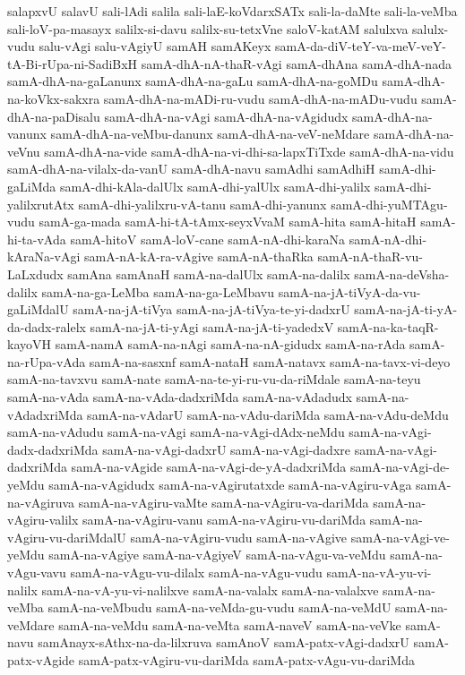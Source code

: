 {salapxvU
salavU
sali-lAdi
salila
sali-laE-koVdarxSATx
sali-la-daMte
sali-la-veMba
sali-loV-pa-masayx
salilx-si-davu
salilx-su-tetxVne
saloV-katAM
salulxva
salulx-vudu
salu-vAgi
salu-vAgiyU
samAH
samAKeyx
samA-da-diV-teY-va-meV-veY-tA-Bi-rUpa-ni-SadiBxH
samA-dhA-nA-thaR-vAgi
samA-dhAna
samA-dhA-nada
samA-dhA-na-gaLanunx
samA-dhA-na-gaLu
samA-dhA-na-goMDu
samA-dhA-na-koVkx-sakxra
samA-dhA-na-mADi-ru-vudu
samA-dhA-na-mADu-vudu
samA-dhA-na-paDisalu
samA-dhA-na-vAgi
samA-dhA-na-vAgidudx
samA-dhA-na-vanunx
samA-dhA-na-veMbu-danunx
samA-dhA-na-veV-neMdare
samA-dhA-na-veVnu
samA-dhA-na-vide
samA-dhA-na-vi-dhi-sa-lapxTiTxde
samA-dhA-na-vidu
samA-dhA-na-vilalx-da-vanU
samA-dhA-navu
samAdhi
samAdhiH
samA-dhi-gaLiMda
samA-dhi-kAla-dalUlx
samA-dhi-yalUlx
samA-dhi-yalilx
samA-dhi-yalilxrutAtx
samA-dhi-yalilxru-vA-tanu
samA-dhi-yanunx
samA-dhi-yuMTAgu-vudu
samA-ga-mada
samA-hi-tA-tAmx-seyxVvaM
samA-hita
samA-hitaH
samA-hi-ta-vAda
samA-hitoV
samA-loV-cane
samA-nA-dhi-karaNa
samA-nA-dhi-kAraNa-vAgi
samA-nA-kA-ra-vAgive
samA-nA-thaRka
samA-nA-thaR-vu-LaLxdudx
samAna
samAnaH
samA-na-dalUlx
samA-na-dalilx
samA-na-deVsha-dalilx
samA-na-ga-LeMba
samA-na-ga-LeMbavu
samA-na-jA-tiVyA-da-vu-gaLiMdalU
samA-na-jA-tiVya
samA-na-jA-tiVya-te-yi-dadxrU
samA-na-jA-ti-yA-da-dadx-ralelx
samA-na-jA-ti-yAgi
samA-na-jA-ti-yadedxV
samA-na-ka-taqR-kayoVH
samA-namA
samA-na-nAgi
samA-na-nA-gidudx
samA-na-rAda
samA-na-rUpa-vAda
samA-na-sasxnf
samA-nataH
samA-natavx
samA-na-tavx-vi-deyo
samA-na-tavxvu
samA-nate
samA-na-te-yi-ru-vu-da-riMdale
samA-na-teyu
samA-na-vAda
samA-na-vAda-dadxriMda
samA-na-vAdadudx
samA-na-vAdadxriMda
samA-na-vAdarU
samA-na-vAdu-dariMda
samA-na-vAdu-deMdu
samA-na-vAdudu
samA-na-vAgi
samA-na-vAgi-dAdx-neMdu
samA-na-vAgi-dadx-dadxriMda
samA-na-vAgi-dadxrU
samA-na-vAgi-dadxre
samA-na-vAgi-dadxriMda
samA-na-vAgide
samA-na-vAgi-de-yA-dadxriMda
samA-na-vAgi-de-yeMdu
samA-na-vAgidudx
samA-na-vAgirutatxde
samA-na-vAgiru-vAga
samA-na-vAgiruva
samA-na-vAgiru-vaMte
samA-na-vAgiru-va-dariMda
samA-na-vAgiru-valilx
samA-na-vAgiru-vanu
samA-na-vAgiru-vu-dariMda
samA-na-vAgiru-vu-dariMdalU
samA-na-vAgiru-vudu
samA-na-vAgive
samA-na-vAgi-ve-yeMdu
samA-na-vAgiye
samA-na-vAgiyeV
samA-na-vAgu-va-veMdu
samA-na-vAgu-vavu
samA-na-vAgu-vu-dilalx
samA-na-vAgu-vudu
samA-na-vA-yu-vi-nalilx
samA-na-vA-yu-vi-nalilxve
samA-na-valalx
samA-na-valalxve
samA-na-veMba
samA-na-veMbudu
samA-na-veMda-gu-vudu
samA-na-veMdU
samA-na-veMdare
samA-na-veMdu
samA-na-veMta
samA-naveV
samA-na-veVke
samA-navu
samAnayx-sAthx-na-da-lilxruva
samAnoV
samA-patx-vAgi-dadxrU
samA-patx-vAgide
samA-patx-vAgiru-vu-dariMda
samA-patx-vAgu-vu-dariMda
}
